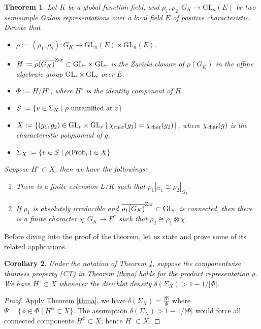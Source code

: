 \documentclass[20pt, oneside]{article}   	%
\newtheorem{thm}{Theorem}[section]
\newtheorem{cor}[thm]{Corollary}
\theoremstyle{definition}
\newcommand{\GL}{\mathrm{GL}}
\begin{document}
\begin{thm}\label{thmb}
Let $K$ be a global function field, and  $\rho_1,\rho_2:G_K\rightarrow \GL_n(E)$ be two semisimple Galois representations over a local field $E$ of positive characteristic. Denote that
\begin{itemize}
\item $\rho:=(\rho_1,\rho_2):G_K\rightarrow \GL_n(E)\times\GL_n(E).$
\item$ H:=\overline{\rho(G_K)}^{\rm Zar}\subset \GL_r\times\GL_r$ is the Zariski closure of $\rho(G_K)$ in the affine algebraic group $\GL_r\times\GL_r$ over $E$.
\item $\Phi:=H/H^\circ$, where $H^\circ$ is the identity component of $H$.
\item $S:=\{v\in\Sigma_K\mid \rho\ {\rm unramified\ at\ }v\}$
\item$X:=\left\{(g_1,g_2)\in \GL_r\times\GL_r\mid \chi_{\rm char}(g_1)=\chi_{\rm char}(g_2) \right\}$, where $\chi_{\rm char}(g)$ is the characteristic polynomial of $g$. 
\item $\Sigma_X:=\{v\in S\mid \rho({\rm Frob}_v)\in X\}$
\end{itemize}

Suppose $H^\circ\subset X$, then we have the followings:
\begin{enumerate}
\item[(i)] There is a finite extension $L/K$ such that $\rho_1|_{G_L}\cong\rho_2|_{G_L}$
\item[(ii)]  If $\rho_1$ is absolutely irreducible and $\overline{\rho_1(G_K)}^{\rm Zar}\subset \GL_r$ is connected, then there is a finite character $\chi:G_K\rightarrow E^*$ such that $\rho_2\cong\rho_1\otimes \chi$.
\end{enumerate}
\end{thm}


Before diving into the proof of the theorem, let us state and prove some of its related applications.

\begin{cor}\label{cor1}
Under the notation of Theorem \ref{thmb}, suppose the componentwise thinness property (CT) in Theorem \ref{thma} holds for the product representation $\rho$. We have $H^\circ\subset X$ whenever the dirichlet density ${\delta}(\Sigma_X)>1-1/|\Phi|$.
\end{cor}
\begin{proof}
Apply Theorem \ref{thma}, we have $\delta(\Sigma_X)=\frac{|\Psi|}{\Phi}$ where $\Psi=\{\phi\in\Phi\mid H^\phi\subset X\}$. The assumption $\delta(\Sigma_X)>1-1/|\Phi|$ would force all connected components $H^\phi\subset X$; hence $H^\circ\subset X$.
\end{proof}
\end{document}
